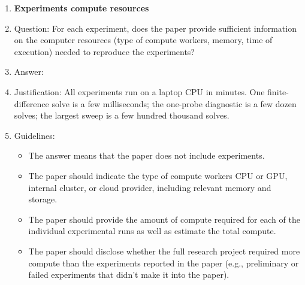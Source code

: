 \begin{enumerate}
\begin{itemize}
        \item It is OK to report 1-sigma error bars, but one should state it. The authors should preferably report a 2-sigma error bar than state that they have a 96\% CI, if the hypothesis of Normality of errors is not verified.
        \item For asymmetric distributions, the authors should be careful not to show in tables or figures symmetric error bars that would yield results that are out of range (e.g., negative error rates).
        \item If error bars are reported in tables or plots, the authors should explain in the text how they were calculated and reference the corresponding figures or tables in the text.
    \end{itemize}

\item {\bf Experiments compute resources}
    \item[] Question: For each experiment, does the paper provide sufficient information on the computer resources (type of compute workers, memory, time of execution) needed to reproduce the experiments?
    \item[] Answer: \answerYes{} %
    \item[] Justification: All experiments run on a laptop CPU in minutes. One finite-difference solve is a few milliseconds; the one-probe diagnostic is a few dozen solves; the largest sweep is a few hundred thousand solves.
    \item[] Guidelines:
    \begin{itemize}
        \item The answer \answerNA{} means that the paper does not include experiments.
        \item The paper should indicate the type of compute workers CPU or GPU, internal cluster, or cloud provider, including relevant memory and storage.
        \item The paper should provide the amount of compute required for each of the individual experimental runs as well as estimate the total compute. 
        \item The paper should disclose whether the full research project required more compute than the experiments reported in the paper (e.g., preliminary or failed experiments that didn't make it into the paper). 
    \end{itemize}
    

\end{enumerate}
